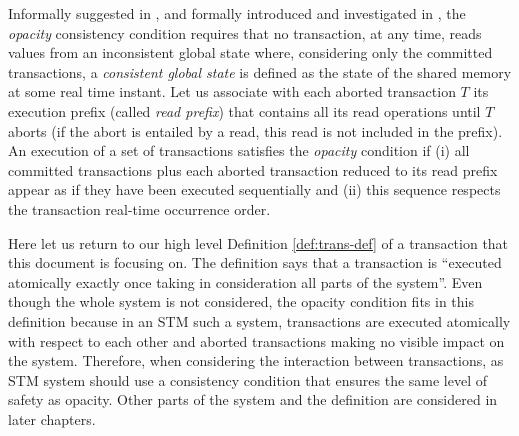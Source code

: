Informally suggested  in   \cite{DSS06},  and  formally introduced  
and investigated in \cite{GK08}, the  {\it   opacity} consistency condition
requires  that  no transaction, at any time, reads  values from an inconsistent global 
state  where, considering only the committed transactions,  
a  {\it consistent  global  state} is defined as the  
state of the shared memory at some real time instant. 
%
Let  us  associate with each  aborted  transaction $T$ 
its execution prefix (called {\it read prefix}) that contains all its  
read operations  until  $T$  aborts  (if
the  abort is  entailed by  a read, this  read is not included in the prefix). 
An  execution of a set of  transactions satisfies the {\it opacity} 
condition  if (i) all   committed transactions plus  
each aborted transaction reduced to its read prefix appear  
as if they  have been  executed sequentially and (ii)  
this sequence respects the transaction real-time occurrence order.

Here let us return to our high level Definition \ref{def:trans-def} of a transaction that
this document is focusing on.
The definition says that a transaction is ``executed atomically exactly once
taking in consideration all parts of the system''.
Even though the whole system is not considered, the opacity condition fits
in this definition because
in an STM such a system, transactions are executed atomically
with respect to each other and aborted transactions making no visible
impact on the system.
Therefore, when considering the interaction between transactions,
as STM system should use a consistency condition that ensures the same
level of safety as opacity.
Other parts of the system and the definition are considered in later chapters.


